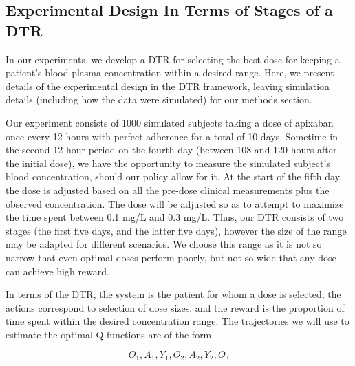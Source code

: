 \subsection{Experimental Design In Terms of Stages of a DTR}

In our experiments, we develop a DTR for selecting the best dose for keeping a patient’s blood plasma concentration within a desired range. Here, we present details of the experimental design in the DTR framework, leaving simulation details (including how the data were simulated) for our methods section.

Our experiment consists of 1000 simulated subjects taking a dose of apixaban once every 12 hours with perfect adherence for a total of 10 days.  Sometime in the second 12 hour period on the fourth day (between 108 and 120 hours after the initial dose), we have the opportunity to measure  the simulated subject’s blood concentration, should our policy allow for it.  At the start of the fifth day, the dose is adjusted based on all the pre-dose clinical measurements plus the observed concentration. The dose will be adjusted so as to attempt to maximize the time spent between 0.1 mg/L and 0.3 mg/L. Thus, our DTR consists of two stages (the first five days, and the latter five days), however the size of the range may be adapted for different scenarios. We choose this range as it is not so narrow that even optimal doses perform poorly, but not so wide that any dose can achieve high reward. 

In terms of the DTR, the system is the patient for whom a dose is selected, the actions correspond to selection of dose sizes, and the reward is the proportion of time spent within the desired concentration range. The trajectories we will use to estimate the optimal Q functions are of the form

\begin{equation}\label{key}
O_1, A_1, Y_1, O_2, A_2, Y_2, O_3
\end{equation}

